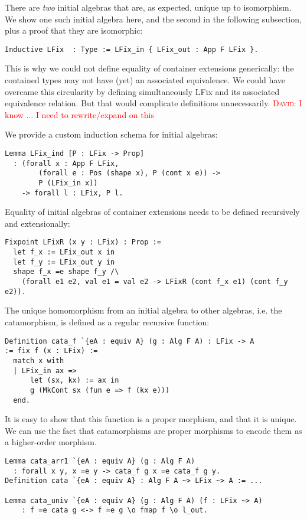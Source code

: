 \documentclass[a4paper, UKenglish, cleveref, autoref, thm-restate]{lipics-v2021}
\newcommand{\dcas}[1]{\textcolor{red}{\textsc{David}: #1}}
\begin{document}
There are \emph{two} initial algebras that are, as expected, unique up to
isomorphism. We show one such initial algebra here, and the second in the
following subsection, plus a proof that they are isomorphic:

\begin{verbatim}
Inductive LFix  : Type := LFix_in { LFix_out : App F LFix }.
\end{verbatim}
This is why we could not define equality of container extensions generically:
the contained types may not have (yet) an associated equivalence. We could have
overcame this circularity by defining simultaneously LFix and its associated
equivalence relation. But that would complicate definitions unnecessarily.
\dcas{I know ... I need to rewrite/expand on this}

We provide a custom induction schema for initial algebras:

\begin{verbatim}
Lemma LFix_ind [P : LFix -> Prop]
  : (forall x : App F LFix,
        (forall e : Pos (shape x), P (cont x e)) ->
        P (LFix_in x))
    -> forall l : LFix, P l.
\end{verbatim}

Equality of initial algebras of container extensions needs to be defined
recursively and extensionally:
\begin{verbatim}
Fixpoint LFixR (x y : LFix) : Prop :=
  let f_x := LFix_out x in
  let f_y := LFix_out y in
  shape f_x =e shape f_y /\
    (forall e1 e2, val e1 = val e2 -> LFixR (cont f_x e1) (cont f_y e2)).
\end{verbatim}

The unique homomorphism from an initial algebra to other algebras, i.e. the catamorphism, is defined as a
regular recursive function:
\begin{verbatim}
Definition cata_f `{eA : equiv A} (g : Alg F A) : LFix -> A
:= fix f (x : LFix) :=
  match x with
  | LFix_in ax =>
      let (sx, kx) := ax in
      g (MkCont sx (fun e => f (kx e)))
  end.
\end{verbatim}

It is easy to show that this function is a proper morphism, and that it is
unique. We can use the fact that catamorphisms are proper morphisms to encode
them as a higher-order morphism.
\begin{verbatim}
Lemma cata_arr1 `{eA : equiv A} (g : Alg F A)
  : forall x y, x =e y -> cata_f g x =e cata_f g y.
Definition cata `{eA : equiv A} : Alg F A ~> LFix ~> A := ...

Lemma cata_univ `{eA : equiv A} (g : Alg F A) (f : LFix ~> A)
    : f =e cata g <-> f =e g \o fmap f \o l_out.
\end{verbatim}
\end{document}

